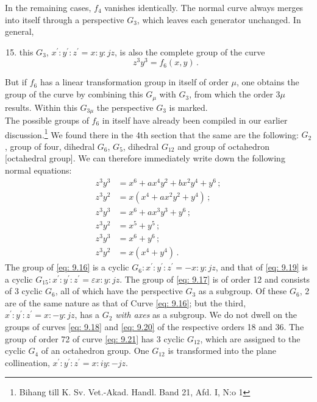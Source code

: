 \documentclass[leqno]{article}
\begin{document}
In the remaining cases, $f_4$ vanishes identically. The normal curve always merges into itself through a perspective $G_3$, which leaves each generator unchanged. In general, 
\begin{enumerate}[label=\arabic*)]
    \setcounter{enumi}{14}
    \item this $G_3$, $x^\prime: y^\prime : z^\prime = x:y:jz$, is also the complete group of the curve 
    \begin{equation}\label{eq: 9.15}
    z^3 y^3 = f_6(x, y) \, . \tag{15}
    \end{equation}
\end{enumerate}
But if $f_6$ has a linear transformation group in itself of order $\mu$, one obtains the group of the curve by combining this $G_\mu$ with $G_3$, from which the order $3\mu$ results. Within this $G_{3 \mu}$ the perspective $G_3$ is marked. \\
The possible groups of $f_6$ in itself have already been compiled in our earlier discussion.\footnote{Bihang till K. Sv. Vet.-Akad. Handl. Band 21, Afd. I, N:o 1} We found there in the 4th section that the same are the following: $G_2$, group of four, dihedral $G_6$, $G_5$, dihedral $G_{12}$ and group of octahedron [octahedral group]. We can therefore immediately write down the following normal equations:
\begin{align}
	z^3 y^3 &= x^6 + ax^4 y^2 + bx^2 y^4 + y^6 \, ; \label{eq: 9.16} \tag{16} \\
	z^3 y^2 &= x(x^4 + ax^2 y^2 + y^4) \, ; \label{eq: 9.17} \tag{17} \\ 
	z^3 y^3 &= x^6 + a x^3 y^3 + y^6 \, ; \label{eq: 9.18} \tag{18} \\
	z^3 y^2 &= x^5 + y^5 \, ; \label{eq: 9.19} \tag{19} \\ 
	z^3 y^3 &= x^6 + y^6 \, ; \label{eq: 9.20} \tag{20} \\ 
	z^3 y^2 &= x(x^4 + y^4) \, . \label{eq: 9.21} \tag{21} 
\end{align}
The group of \eqref{eq: 9.16} is a cyclic $G_6 : x^\prime: y^\prime : z^\prime = - x : y: jz$, and that of \eqref{eq: 9.19} is a cyclic $G_{15} : x ^\prime : y^\prime : z^\prime = \varepsilon x : y : jz$. The group of \eqref{eq: 9.17} is of order 12 and consists of 3 cyclic $G_6$, all of which have the perspective $G_3$ as a subgroup. Of these $G_6$, 2 are of the same nature as that of Curve \eqref{eq: 9.16}; but the third, $x^\prime : y^\prime : z^\prime = x : -y : jz$, has a $G_2$ \textit{with axes} as a subgroup. We do not dwell on the groups of curves \eqref{eq: 9.18} and \eqref{eq: 9.20} of the respective orders 18 and 36. The group of order 72 of curve \eqref{eq: 9.21} has 3 cyclic $G_{12}$, which are assigned to the cyclic $G_4$ of an octahedron group. One $G_{12}$ is transformed into the plane collineation, $x^\prime : y^\prime : z^\prime = x : iy : -jz$. \\
\end{document}
